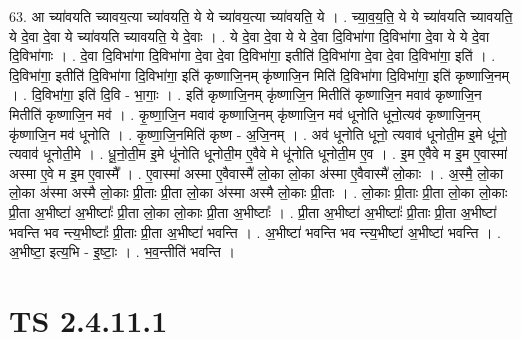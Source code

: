 \documentclass[17pt]{extarticle}
\begin{document}
63. आ च्या॑वयति च्यावय॒त्या च्या॑वयति॒ ये ये च्या॑वय॒त्या च्या॑वयति॒ ये । . च्या॒व॒य॒ति॒ ये ये च्या॑वयति च्यावयति॒ ये दे॒वा दे॒वा ये च्या॑वयति च्यावयति॒ ये दे॒वाः । . ये दे॒वा दे॒वा ये ये दे॒वा दि॒विभा॑गा दि॒विभा॑गा दे॒वा ये ये दे॒वा दि॒विभा॑गाः । . दे॒वा दि॒विभा॑गा दि॒विभा॑गा दे॒वा दे॒वा दि॒विभा॑गा॒ इतीति॑ दि॒विभा॑गा दे॒वा दे॒वा दि॒विभा॑गा॒ इति॑ । . दि॒विभा॑गा॒ इतीति॑ दि॒विभा॑गा दि॒विभा॑गा॒ इति॑ कृष्णाजि॒नम् कृ॑ष्णाजि॒न मिति॑ दि॒विभा॑गा दि॒विभा॑गा॒ इति॑ कृष्णाजि॒नम् । . दि॒विभा॑गा॒ इति॑ दि॒वि - भा॒गाः॒ । . इति॑ कृष्णाजि॒नम् कृ॑ष्णाजि॒न मितीति॑ कृष्णाजि॒न मवाव॑ कृष्णाजि॒न मितीति॑ कृष्णाजि॒न मव॑ । . कृ॒ष्णा॒जि॒न मवाव॑ कृष्णाजि॒नम् कृ॑ष्णाजि॒न मव॑ धूनोति धूनो॒त्यव॑ कृष्णाजि॒नम् कृ॑ष्णाजि॒न मव॑ धूनोति । . कृ॒ष्णा॒जि॒नमिति॑ कृष्ण - अ॒जि॒नम् । . अव॑ धूनोति धूनो॒ त्यवाव॑ धूनोती॒म इ॒मे धू॑नो॒ त्यवाव॑ धूनोती॒मे । . धू॒नो॒ती॒म इ॒मे धू॑नोति धूनोती॒म ए॒वैवे मे धू॑नोति धूनोती॒म ए॒व । . इ॒म ए॒वैवे म इ॒म ए॒वास्मा॑ अस्मा ए॒वे म इ॒म ए॒वास्मै᳚ । . ए॒वास्मा॑ अस्मा ए॒वैवास्मै॑ लो॒का लो॒का अ॑स्मा ए॒वैवास्मै॑ लो॒काः । . अ॒स्मै॒ लो॒का लो॒का अ॑स्मा अस्मै लो॒काः प्री॒ताः प्री॒ता लो॒का अ॑स्मा अस्मै लो॒काः प्री॒ताः । . लो॒काः प्री॒ताः प्री॒ता लो॒का लो॒काः प्री॒ता अ॒भीष्टा॑ अ॒भीष्टाः᳚ प्री॒ता लो॒का लो॒काः प्री॒ता अ॒भीष्टाः᳚ । . प्री॒ता अ॒भीष्टा॑ अ॒भीष्टाः᳚ प्री॒ताः प्री॒ता अ॒भीष्टा॑ भवन्ति भव न्त्य॒भीष्टाः᳚ प्री॒ताः प्री॒ता अ॒भीष्टा॑ भवन्ति । . अ॒भीष्टा॑ भवन्ति भव न्त्य॒भीष्टा॑ अ॒भीष्टा॑ भवन्ति । . अ॒भीष्टा॒ इत्य॒भि - इ॒ष्टाः॒ । . भ॒व॒न्तीति॑ भवन्ति । \newline
\pagebreak
{}
\section*{ TS 2.4.11.1 }
\end{document}
